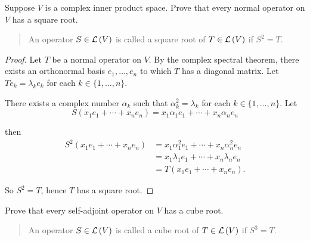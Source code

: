 \begin{exercise}
    Suppose $V$ is a complex inner product space. Prove that every normal operator on $V$ has a square root.
\end{exercise}

\begin{quote}
    An operator $S \in \mathcal{L}\left({V}\right)$ is called a square root of $T\in \mathcal{L}\left({V}\right)$ if $S^{2} = T$.
\end{quote}

\begin{proof}
    Let $T$ be a normal operator on $V$. By the complex spectral theorem, there exists an orthonormal basis $e_{1}, \ldots, e_{n}$ to which $T$ has a diagonal matrix. Let $Te_{k} = \lambda_{k}e_{k}$ for each $k\in\{ 1,\ldots, n \}$.

    There exists a complex number $\alpha_{k}$ such that $\alpha_{k}^{2} = \lambda_{k}$ for each $k\in\{1,\ldots, n\}$. Let
    \[
        S(x_{1}e_{1} + \cdots + x_{n}e_{n}) = x_{1}\alpha_{1}e_{1} + \cdots + x_{n}\alpha_{n}e_{n}
    \]

    then
    \begin{align*}
        S^{2}(x_{1}e_{1} + \cdots + x_{n}e_{n}) & = x_{1}\alpha_{1}^{2}e_{1} + \cdots + x_{n}\alpha_{n}^{2}e_{n} \\
                                                & = x_{1}\lambda_{1}e_{1} + \cdots + x_{n}\lambda_{n}e_{n}       \\
                                                & = T(x_{1}e_{1} + \cdots + x_{n}e_{n}).
    \end{align*}

    So $S^{2} = T$, hence $T$ has a square root.
\end{proof}
\newpage

\begin{exercise}
    Prove that every self-adjoint operator on $V$ has a cube root.
\end{exercise}

\begin{quote}
    An operator $S \in \mathcal{L}\left({V}\right)$ is called a cube root of $T\in\mathcal{L}\left({V}\right)$ if $S^{3} = T$.
\end{quote}

